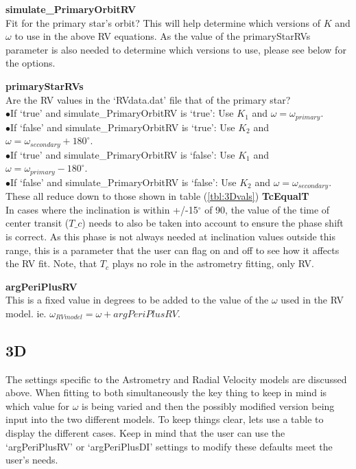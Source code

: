 \documentclass[12pt,preprint]{aastex}
\begin{document}
{\bf simulate\_PrimaryOrbitRV}\\
Fit for the primary star's orbit?  This will help determine which versions of $K$ and $\omega$ to use in the above RV equations.  As the value of the primaryStarRVs parameter is also needed to determine which versions to use, please see below for the options.

{\bf primaryStarRVs}\\
Are the RV values in the `RVdata.dat' file that of the primary star?  \\
$\bullet$If `true' and simulate\_PrimaryOrbitRV is `true': Use $K_1$ and $\omega = \omega_{primary}$.\\
$\bullet$If `false' and simulate\_PrimaryOrbitRV is `true': Use $K_2$ and $\omega = \omega_{secondary}+180^{\circ}.$\\
$\bullet$If `true' and simulate\_PrimaryOrbitRV is `false': Use $K_1$ and $\omega = \omega_{primary}-180^{\circ}$.\\
$\bullet$If `false' and simulate\_PrimaryOrbitRV is `false': Use $K_2$ and $\omega = \omega_{secondary}$.\\
These all reduce down to those shown in table (\ref{tbl:3Dvals})
{\bf TcEqualT}\\
In cases where the inclination is within +/-15$^{\circ}$ of 90, the value of the time of center transit ($T\_c$) needs to also be taken into account to ensure the phase shift is correct.  As this phase is not always needed at inclination values outside this range, this is a parameter that the user can flag on and off to see how it affects the RV fit.  Note, that $T_c$ plays no role in the astrometry fitting, only RV.

{\bf argPeriPlusRV}\\
This is a fixed value in degrees to be added to the value of the $\omega$ used in the RV model. ie. $\omega_{RVmodel}=\omega+argPeriPlusRV$.
\subsection{3D}
The settings specific to the Astrometry and Radial Velocity models are discussed above.  When fitting to both simultaneously the key thing to keep in mind is which value for $\omega$ is being varied and then the possibly modified version being input into the two different models.  To keep things clear, lets use a table to display the different cases.  Keep in mind that the user can use the `argPeriPlusRV' or `argPeriPlusDI' settings to modify these defaults meet the user's needs.
\end{document}
